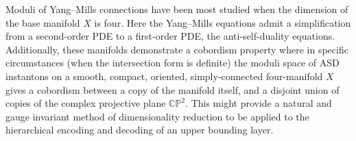\documentclass{article}
\begin{document}
    Moduli of Yang–Mills connections have been most studied when the dimension of the base manifold $X$ is four. Here the Yang–Mills equations admit a simplification from a second-order PDE to a first-order PDE, the anti-self-duality equations. 
    Additionally, these manifolds demonstrate a cobordism property where in specific circumstances (when the intersection form is definite) the moduli space of ASD instantons on a smooth, compact, oriented, simply-connected four-manifold $X$ gives a cobordism between a copy of the manifold itself, and a disjoint union of copies of the complex projective plane ${\displaystyle \mathbb {CP} ^{2}}$. This might provide a natural and gauge invariant method of dimensionality reduction to be applied to the hierarchical encoding and decoding of an upper bounding layer.
    




\end{document}
